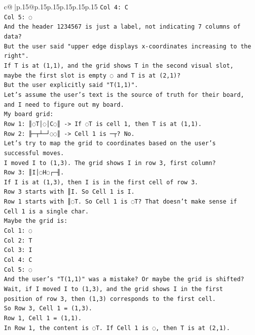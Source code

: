 \documentclass{article}
\begin{document}
{\begin{supertabular}{c@{$\;$}|p{.15\linewidth}@{}p{.15\linewidth}p{.15\linewidth}p{.15\linewidth}p{.15\linewidth}p{.15\linewidth}}
{{{\texttt{Col 4: C} \\
\texttt{Col 5: ◌} \\
\texttt{And the header 1234567 is just a label, not indicating 7 columns of data?} \\
\texttt{But the user said "upper edge displays x{-}coordinates increasing to the right".} \\
\texttt{If T is at (1,1), and the grid shows T in the second visual slot, maybe the first slot is empty ◌ and T is at (2,1)?} \\
\texttt{But the user explicitly said "T(1,1)".} \\
\texttt{Let's assume the user's text is the source of truth for their board, and I need to figure out my board.} \\
\texttt{My board grid:} \\
\texttt{Row 1: ║◌T│◌│C◌║ {-}> If ◌T is cell 1, then T is at (1,1).} \\
\texttt{Row 2: ╟─┬┴─┘◌◌║ {-}> Cell 1 is ─┬? No.} \\
\texttt{Let's try to map the grid to coordinates based on the user's successful moves.} \\
\texttt{I moved I to (1,3). The grid shows I in row 3, first column?} \\
\texttt{Row 3: ║I│◌H◌┌─╢.} \\
\texttt{If I is at (1,3), then I is in the first cell of row 3.} \\
\texttt{Row 3 starts with ║I. So Cell 1 is I.} \\
\texttt{Row 1 starts with ║◌T. So Cell 1 is ◌T? That doesn't make sense if Cell 1 is a single char.} \\
\texttt{Maybe the grid is:} \\
\texttt{Col 1: ◌} \\
\texttt{Col 2: T} \\
\texttt{Col 3: I} \\
\texttt{Col 4: C} \\
\texttt{Col 5: ◌} \\
\texttt{And the user's "T(1,1)" was a mistake? Or maybe the grid is shifted?} \\
\texttt{Wait, if I moved I to (1,3), and the grid shows I in the first position of row 3, then (1,3) corresponds to the first cell.} \\
\texttt{So Row 3, Cell 1 = (1,3).} \\
\texttt{Row 1, Cell 1 = (1,1).} \\
\texttt{In Row 1, the content is ◌T. If Cell 1 is ◌, then T is at (2,1).} \\
}}}
\end{supertabular}}
\end{document}
